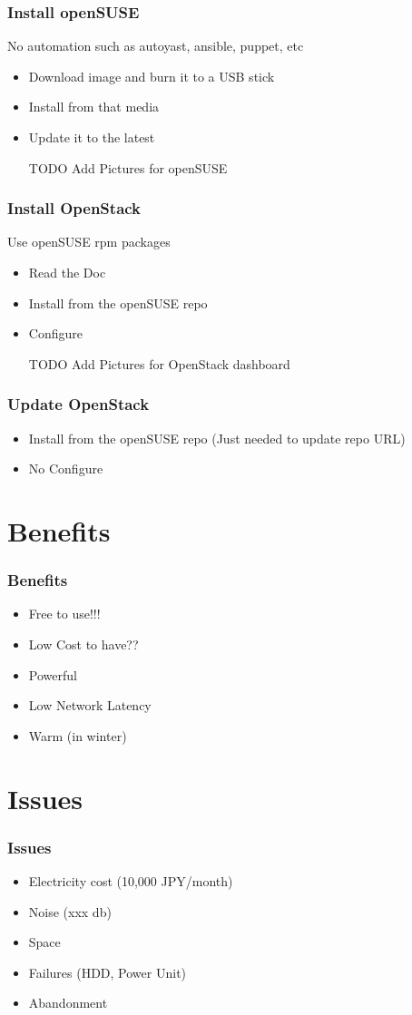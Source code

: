 \documentclass[aspectratio=169,11pt,hyperref={colorlinks=true}]{beamer}
\begin{document}
\begin{frame}
  \frametitle{Install openSUSE}
  No automation such as autoyast, ansible, puppet, etc
  \begin{itemize}
    \item Download image and burn it to a USB stick
    \item Install from that media
    \item Update it to the latest
    \item [TODO] Add Pictures for openSUSE
  \end{itemize}
\end{frame}

\begin{frame}
  \frametitle{Install OpenStack}
  Use openSUSE rpm packages
  \begin{itemize}
    \item Read the Doc
    \item Install from the openSUSE repo
    \item Configure
    \item [TODO] Add Pictures for OpenStack dashboard
  \end{itemize}
\end{frame}

\begin{frame}
  \frametitle{Update OpenStack}
  \begin{itemize}
    \item Install from the openSUSE repo (Just needed to update repo URL)
    \item No Configure
  \end{itemize}
\end{frame}

\section{Benefits}
\begin{frame}
  \frametitle{Benefits}
  \begin{itemize}
    \item Free to use!!!
    \item Low Cost to have??
    \item Powerful
    \item Low Network Latency
    \item Warm (in winter)
  \end{itemize}
\end{frame}

\section{Issues}
\begin{frame}
  \frametitle{Issues}
  \begin{itemize}
    \item Electricity cost (10,000 JPY/month)
    \item Noise (xxx db)
    \item Space
    \item Failures (HDD, Power Unit)
    \item Abandonment
  \end{itemize}
\end{frame}
\end{document}
